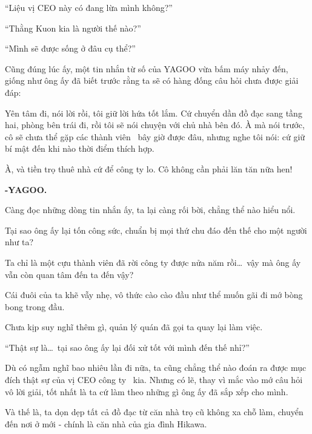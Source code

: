 \documentclass[../main.tex]{subfiles}
\begin{document}
``Liệu vị CEO này có đang lừa mình không?''

``Thằng Kuon kia là người thế nào?''

``Mình sẽ được sống ở đâu cụ thể?''

Cũng đúng lúc ấy, một tin nhắn từ số của YAGOO vừa bấm máy nhảy đến, giống như ông ấy đã biết trước rằng ta sẽ có hàng đống câu hỏi chưa được giải đáp:

\begin{tcolorbox}[
    colframe=vol,    %
    colback=white,   %
    boxrule=0.5pt,   %
    arc=0mm,         %
    left=5pt,        %
    right=5pt,       %
    top=5pt,         %
    bottom=5pt       %
  ]
  {Yên tâm đi, nói lời rồi, tôi giữ lời hứa tốt lắm. Cứ chuyển dần đồ đạc sang tầng hai, phòng bên trái đi, rồi tôi sẽ nói chuyện với chủ nhà bên đó. À mà nói trước, cô sẽ chưa thể gặp các thành viên \hll\ bây giờ được đâu, nhưng nghe tôi nói: cứ giữ bí mật đến khi nào thời điểm thích hợp.

    À, và tiền trọ thuê nhà cứ để công ty lo. Cô không cần phải lăn tăn nữa hen!

    \hfill\textbf{-YAGOO.}}
\end{tcolorbox}

Càng đọc những dòng tin nhắn ấy, ta lại càng rối bời, chẳng thể nào hiểu nổi.

Tại sao ông ấy lại tốn công sức, chuẩn bị mọi thứ chu đáo đến thế cho một người như ta?

Ta chỉ là một cựu thành viên đã rời công ty được nửa năm rồi\dots\ vậy mà ông ấy vẫn còn quan tâm đến ta đến vậy?

Cái đuôi của ta khẽ vẫy nhẹ, vô thức cào cào đầu như thể muốn gãi đi mớ bòng bong trong đầu.

Chưa kịp suy nghĩ thêm gì, quản lý quán đã gọi ta quay lại làm việc.

``Thật sự là\dots\ tại sao ông ấy lại đối xử tốt với mình đến thế nhỉ?''

Dù có ngẫm nghĩ bao nhiêu lần đi nữa, ta cũng chẳng thể nào đoán ra được mục đích thật sự của vị CEO công ty \hll\ kia. Nhưng có lẽ, thay vì mắc vào mớ câu hỏi vô lời giải, tốt nhất là ta cứ làm theo những gì ông ấy đã sắp xếp cho mình.

Và thế là, ta dọn dẹp tất cả đồ đạc từ căn nhà trọ cũ không xa chỗ làm, chuyển đến nơi ở mới - chính là căn nhà của gia đình Hikawa.
\end{document}
